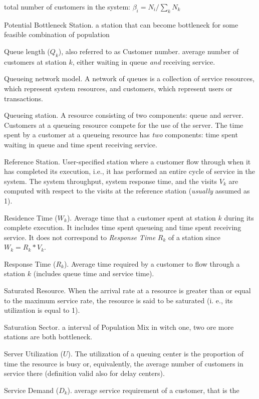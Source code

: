 \begin{description*}
total number of customers in the system: $\beta_i = N_i / \sum_k
N_k$ \item[Potential Bottleneck Station.] a station that can
become bottleneck for some feasible combination of population
\item[Queue length ($Q_k$), also referred to as Customer number.]
average number of customers at station $k$, either waiting in
queue \emph{and} receiving service. \item[Queueing network model.]
A network of queues is a collection of service resources, which
represent system resources, and customers, which represent users
or transactions. \item[Queueing station.] A resource consisting of
two components: queue and server. Customers at a queueing resource
compete for the use of the server. The time spent by a customer at
a queueing resource has \emph{two} components: time spent waiting
in queue and time spent receiving service. \item[Reference
Station.] User-specified station where a customer flow through
when it has completed its execution, i.e., it has performed an
entire cycle of service in the system. The system throughput,
system response time, and the visits $V_k$ are computed with
respect to the visits at the reference station (\emph{usually}
assumed as 1). \item[Residence Time ($W_k$).] Average time that a
customer spent at station $k$ during its complete execution. It
includes time spent queueing and time spent receiving service. It
does not correspond to \emph{Response Time} $R_k$ of a station
since $W_k = R_k * V_k$. \item[Response Time ($R_k$).] Average
time required by a customer to flow through a station $k$
(includes queue time and service time).
\item[Saturated Resource.]
When the arrival rate at a resource is greater than or equal to
the maximum service rate, the resource is said to be saturated (i.
e., its utilization is equal to 1). \item[Saturation Sector.] a
interval of Population Mix in witch one, two ore more stations are
both bottleneck. \item[Server Utilization ($U$).] The utilization
of a queuing center is the proportion of time the resource is busy
or, equivalently, the average number of customers in service there
(definition valid also for delay centers). \item[Service Demand
($D_k$).] average service requirement of a customer, that is the

\end{description*}
